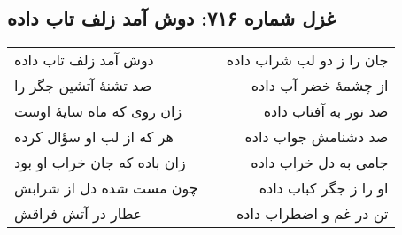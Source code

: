 \begin{center}
\section*{غزل شماره ۷۱۶: دوش آمد زلف تاب داده}
\label{sec:716}
\begin{longtable}{l p{0.5cm} r}
دوش آمد زلف تاب داده
&&
جان را ز دو لب شراب داده
\\
صد تشنهٔ آتشین جگر را
&&
از چشمهٔ خضر آب داده
\\
زان روی که ماه سایهٔ اوست
&&
صد نور به آفتاب داده
\\
هر که از لب او سؤال کرده
&&
صد دشنامش جواب داده
\\
زان باده که جان خراب او بود
&&
جامی به دل خراب داده
\\
چون مست شده دل از شرابش
&&
او را ز جگر کباب داده
\\
عطار در آتش فراقش
&&
تن در غم و اضطراب داده
\\
\end{longtable}
\end{center}
